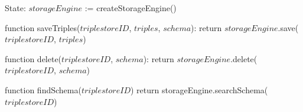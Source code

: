 State:
    $storageEngine$ := createStorageEngine()

function saveTriples($triplestoreID$, $triples$, $schema$):
    return $storageEngine$.save($triplestoreID$, $triples$)

function delete($triplestoreID$, $schema$):
    return $storageEngine$.delete($triplestoreID$, $schema$)

function findSchema($triplestoreID$)
    return storageEngine.searchSchema($triplestoreID$)